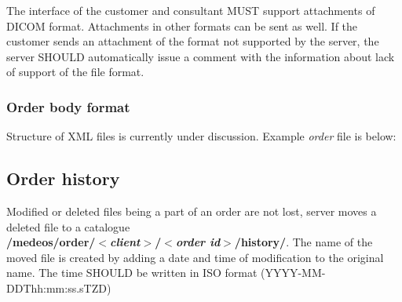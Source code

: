 \documentclass[a4paper]{article}
\begin{document}
The interface of the customer and consultant MUST support attachments of DICOM format. 
Attachments in other formats can be sent as well. If the customer sends an attachment of the 
format not supported by the server, the server SHOULD automatically issue a comment with the 
information about lack of support of the file format.

\subsubsection{Order body format}

Structure of XML files is currently under discussion. Example \emph{order} file is below:



\subsection{Order history}
\label{sec:hist}

Modified or deleted files being a part of an 
order are not lost, server moves a deleted file to a catalogue\\
\textbf{/medeos/order/$<$\textit{client}$>$/$<$\textit{order id}$>$/history/}.
The name of the moved file is created by adding a date and time of modification to the
original name. The time SHOULD be written in ISO format (YYYY-MM-DDThh:mm:ss.sTZD)
\end{document}
